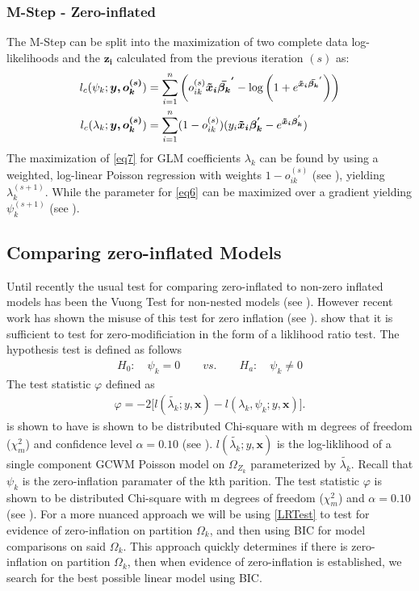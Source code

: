 \documentclass[11pt,letterpaper]{article}
\numberwithin{equation}{section}
\numberwithin{equation}{section}
\numberwithin{equation}{section}
\begin{document}
\subsubsection{M-Step - Zero-inflated}
The M-Step can be split into the maximization of two complete data log-likelihoods and the $\bm{z_i}$ calculated from the previous iteration $(s)$ as:
\begin{align}
l_c(\psi_k;\bm{y,o_k^{(s)}}) &=\sum_{i=1}^n \left( o_{ik}^{(s)} \bm{\bm{\tilde{x}}_i \bar{\beta_k }^{'}} - \log \left(1+ e^{\bm{ \bm{\tilde{x}}_i \bar{\beta_k }}^{'}} \right) \right)  \label{eq6}   \\
 l_c(\lambda_k; \bm{y,o_k^{(s)}}) &= \sum_{i=1}^n (1- o_{ik}^{(s)}) (y_i \bm{ \bm{\tilde{x}}_i \beta_k^{'} } - e^{\bm{\bm{\tilde{x}}_i \beta_k}^{'}})\label{eq7}
 \end{align}
The maximization of \eqref{eq7} for GLM coefficients $\lambda_k$ can be found by using a weighted, log-linear Poisson regression with weights $1 - o_{ik}^{(s)}$ (see \cite{McCullaghNelder1989}), yielding $\lambda_k^{(s+1)}$.
While the parameter for \eqref{eq6} can be maximized over a gradient yielding $\psi_k^{(s+1)}$ (see \cite{Lambert}).

\subsection{Comparing zero-inflated Models}

Until recently the usual test for comparing zero-inflated to non-zero inflated models has been the Vuong Test for non-nested models (see \cite{vuongTest}). However recent work has shown the misuse of this test for zero inflation (see \cite{misuse}). \cite{newIntuitive} show that it is sufficient to test for zero-modificiation in the form of a liklihood ratio test. The hypothesis test is defined as follows
\begin{align*}
& & H_0: \quad \psi_k = 0 \quad\quad vs. \quad\quad H_a: \quad \psi_k \neq 0  & &
\end{align*}
The test statistic $\varphi$ defined as 
\begin{align}
\varphi = -2 \bigg[l(\tilde{\lambda_k}; y, \bm{x}) - l(\lambda_k, \psi_k; y , \bm{x} )\bigg].
\label{LRTest}
\end{align}
is shown to have is shown to be distributed Chi-square with m degrees of freedom ($\chi^2_m $) and confidence level $\alpha = 0.10$ (see \cite{newIntuitive}).
$l(\tilde{\lambda_k}; y , \bm{x})$ is the log-liklihood of a single component GCWM Poisson model on $\Omega_{Z_k}$ parameterized by $\tilde{\lambda_k}$. Recall that $\psi_k$ is the zero-inflation paramater of the kth parition. The test statistic $\varphi$ is shown to be distributed Chi-square with m degrees of freedom ($\chi^2_m $) and $\alpha = 0.10$ (see \cite{newIntuitive}). For a more nuanced approach we will be using \eqref{LRTest} to  test for evidence of zero-inflation on partition $\Omega_k$, and then using BIC for model comparisons on said $\Omega_k$. This approach quickly determines if there is zero-inflation on partition $\Omega_k$, then when evidence of zero-inflation is established, we search for the best possible linear model using BIC. 
\end{document}
